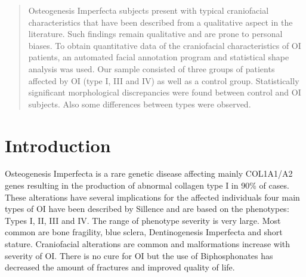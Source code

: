 \documentclass[a0,portrait]{a0poster}
\begin{document}
\begin{multicols}{2} %


\color{FireBrick}
\begin{abstract}
Osteogenesis Imperfecta subjects  present with typical craniofacial
characteristics that have been described from a qualitative aspect in the
literature\cite{rousseau2018osteogenesis}. 
Such findings remain qualitative and are prone to personal biases.
To obtain quantitative data of the craniofacial characteristics of OI patients,
an automated facial annotation program and statistical shape analysis was used.
Our sample consisted of three groups of patients affected by OI (type I, III
and IV) as well as a control group. Statistically significant morphological discrepancies
were found between control and OI subjects. Also some differences between types
were observed.
\end{abstract}


\color{DarkBlue} 
\section{Introduction}

Osteogenesis Imperfecta is a rare genetic disease affecting mainly COL1A1/A2
genes\cite{glorieux2012} resulting in the production of abnormal collagen
type I in 90\% of cases. These alterations have several implications
for the affected individuals four main types of OI have been described
by Sillence\cite{sillence78} and are based on the phenotypes: Types I,
II, III and IV. 
The range of phenotype severity is very large.
Most common are bone fragility, blue sclera, Dentinogenesis Imperfecta and short stature.
Craniofacial alterations are common and malformations increase with severity of OI.
There is no cure for OI but the use of Biphosphonates has decreased the amount of fractures
and improved quality of life.



\end{multicols}
\end{document}
